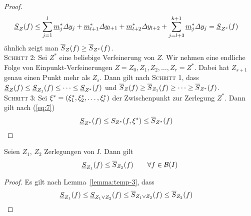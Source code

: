 \begin{lemma}
\begin{proof}
\begin{align*}
            \underline{S}_{Z}\of{f} &\leq \sum_{j=1}^{l} \underline{m}_j^{*} \varDelta y_j + \underline{m}_{l+1}^{*} \varDelta y_{l+1} + \underline{m}_{l+2}^{*}\varDelta y_{l+2} + \sum_{j=l+3}^{k+1} \underline{m}_j^{*}\varDelta y_j = \underline{S}_{Z^{*}}\of{f}
        \end{align*}
        ähnlich zeigt man $\overline{S}_Z\of{f} \geq \overline{S}_{Z^{*}}\of{f}$.\\[10pt]
        \textsc{Schritt 2:} Sei $Z^{*}$ eine beliebige Verfeinerung von $Z$. Wir nehmen eine endliche Folge von Einpunkt-Verfeinerungen $Z=Z_0, Z_1, Z_2, \dots, Z_r = Z^{*}$. Dabei hat $Z_{s+1}$ genau einen Punkt mehr als $Z_{s}$. Dann gilt nach \textsc{Schritt 1}, dass $\underline{S}_{Z}\of{f} \leq \underline{S}_{Z_1}\of{f} \leq \dots \leq \underline{S}_{Z^{*}}\of{f}$ und $\overline{S}_{Z}\of{f} \geq \overline{S}_{Z_1}\of{f} \geq \dots \geq \overline{S}_{Z^{*}}\of{f}$.\\[10pt]
        \textsc{Schritt 3:} Sei $\xi^{*} = \left(\xi_1^{*}, \xi_2^{*}, \dots, \xi_l^{*}\right)$ der Zwischenpunkt zur Zerlegung $Z^{*}$. Dann gilt nach (\ref{eq:7})
        \begin{align*}
            \un{S}_{Z^{*}}\of{f} \leq S_{Z^*}\of{f, \xi^{*}} &\leq \overline{S}_{Z^*}\of{f}\qedhere
        \end{align*}
    \end{proof}
\end{lemma}

\begin{lemma} %
    \label{lemma:temp-4}
    Seien $Z_1$, $Z_2$ Zerlegungen von $I$. Dann gilt
    \begin{align*}
        \underline{S}_{Z_1}\of{f} \leq \overline{S}_{Z_2}\of{f}\qquad\forall f\in \mB\of{I}
    \end{align*}
    \begin{proof}
        Es gilt nach Lemma~\ref{lemma:temp-3}, dass
        \begin{align*}
            \underline{S}_{Z_1}\of{f} &\leq \underline{S}_{Z_1\lor Z_2}\of{f}\leq \overline{S}_{Z_1\lor Z_2}\of{f} \leq \overline{S}_{Z_2}\of{f}\qedhere
        \end{align*}
    \end{proof}
\end{lemma}

